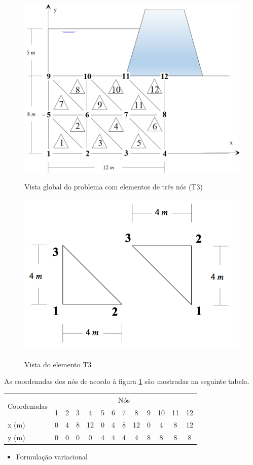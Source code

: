 \documentclass{article} %
\begin{document}
\begin{figure}[H]
	\centering
	\caption{Vista global do problema com elementos de três nós (T3)}	\includegraphics[width=0.65\linewidth]{elemento}	
	\label{global}	
\end{figure}
\begin{figure}[H]
	\centering
	\caption{Vista do elemento T3}	\includegraphics[width=0.45\linewidth]{local}	
	\label{local}	
\end{figure}
As coordenadas dos nós de acordo à figura \ref{global} são mostradas na seguinte tabela.
\begin{table}[H]
	\centering
	\begin{tabular}{@{}lcccccccccccc@{}}
		\toprule
		\multirow{2}{*}{Coordenadas} & \multicolumn{12}{c}{Nós} \\ \cmidrule(l){2-13} 
		& 1 & 2 & 3 & 4 & 5 & 6 & 7 & 8 & 9 & 10 & 11 & 12 \\ \midrule
		x (m) & 0 & 4 & 8 & 12 & 0 & 4 & 8 & 12 & 0 & 4 & 8 & 12 \\
		y (m) & 0 & 0 & 0 & 0 & 4 & 4 & 4 & 4 & 8 & 8 & 8 & 8 \\ \bottomrule
	\end{tabular}
\end{table}

\begin{itemize}
	\item Formulação variacional	
\end{itemize}
\end{document}
